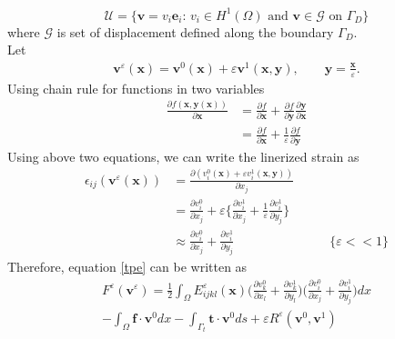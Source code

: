 \documentclass[openright,twoside]{iitkthesis}
\newcommand{\e}[1]{\textbf{#1}}
\begin{document}
\begin{equation}
\mathcal{U} = \{\textbf{v} = v_i\textbf{e}_i :\, v_i\in H^1(\Omega) \text{ and } \textbf{v}\in\mathcal{G} \text{ on } \Gamma_D\}
\end{equation}
where $\mathcal{G}$ is set of displacement defined along the boundary $\Gamma_D$.\\
Let 
\begin{align}
\textbf{v}^\varepsilon(\textbf{x}) = \textbf{v}^0(\textbf{x})+\varepsilon\textbf{v}^1(\textbf{x},\textbf{y}),\qquad \textbf{y}=\frac{\textbf{x}}{\varepsilon}.
\end{align}
Using chain rule for functions in two variables\\
\begin{equation}
\begin{split}
\frac{\partial f(\e x, \e y(\e x))}{\partial \textbf{x}} &= \frac{\partial f}{\partial \textbf{x}}+\frac{\partial f}{\partial \textbf{y}}\frac{\partial \textbf{y}}{\partial \textbf{x}}\\
&=\frac{\partial f}{\partial \textbf{x}}+\frac{1}{\varepsilon}\frac{\partial f}{\partial \textbf{y}}
\end{split}
\end{equation}
Using above two equations, we can write the linerized strain as
\begin{equation}
\begin{split}
\epsilon_{ij}(\textbf{v}^\varepsilon(\textbf{x})) &= \frac{\partial (v_{i}^0(\textbf{x})+\varepsilon v_{i}^1(\textbf{x},\textbf{y}))}{\partial x_j}\\
&=\frac{\partial v_i^0}{\partial x_j}+\varepsilon\bigg\{\frac{\partial v_{i}^1}{\partial x_j}+\frac{1}{\varepsilon}\frac{\partial v_{i}^1}{\partial y_j}\bigg\}\\
&\approx \frac{\partial v_{i}^0}{\partial x_j}+\frac{\partial v_{i}^1}{\partial y_j} &\qquad \{ \varepsilon << 1\}
\end{split}
\end{equation}
Therefore, equation \eqref{tpe} can be written as 
\begin{multline}
F^\varepsilon(\textbf{v}^\varepsilon) = \frac{1}{2}\int_\Omega E^\varepsilon_{ijkl}(\e x)\bigg (\frac{\partial v_{k}^0}{\partial x_l}+\frac{\partial v_{k}^1}{\partial y_l}\bigg )\bigg (\frac{\partial v_{i}^0}{\partial x_j}+\frac{\partial v_{i}^1}{\partial y_j}\bigg )dx\\
-\int_\Omega\textbf{f}\cdot\textbf{v}^0 dx - \int_{\Gamma_t}\textbf{t}\cdot\textbf{v}^0 ds + \varepsilon R^\varepsilon(\textbf{v}^0, \textbf{v}^1)
\end{multline}
\end{document}
